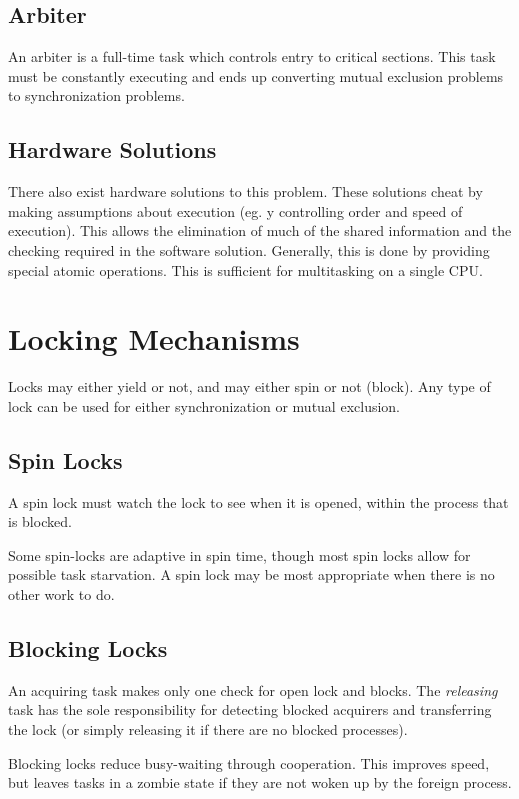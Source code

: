 \documentclass[12pt]{article}
\begin{document}

\subsection{Arbiter}
An arbiter is a full-time task which controls entry to critical sections. This task must be constantly executing and ends up converting mutual exclusion problems to synchronization problems.

\subsection{Hardware Solutions}
There also exist hardware solutions to this problem. These solutions cheat by making assumptions about execution (eg. y controlling order and speed of execution). This allows the elimination of much of the shared information and the checking required in the software solution. Generally, this is done by providing special atomic operations. This is sufficient for multitasking on a single CPU.

\section{Locking Mechanisms}
Locks may either yield or not, and may either spin or not (block). Any type of lock can be used for either synchronization or mutual exclusion.

\subsection{Spin Locks}
A spin lock must watch the lock to see when it is opened, within the process that is blocked.

Some spin-locks are adaptive in spin time, though most spin locks allow for possible task starvation. A spin lock may be most appropriate when there is no other work to do.

\subsection{Blocking Locks}
An acquiring task makes only one check for open lock and blocks. The \textit{releasing} task has the sole responsibility for detecting blocked acquirers and transferring the lock (or simply releasing it if there are no blocked processes).

Blocking locks reduce busy-waiting through cooperation. This improves speed, but leaves tasks in a zombie state if they are not woken up by the foreign process.
\end{document}
